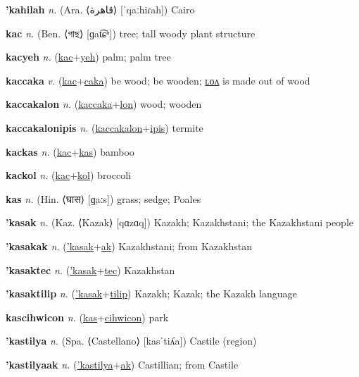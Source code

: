 \textbf{\hypertarget{'kahilah}{'kahilah}} \textit{n.} (Ara. ⟨{\arabics{}قاهرة}⟩ [ˈqaːhiɾah])
Cairo

\textbf{\hypertarget{kac}{kac}} \textit{n.} (Ben. ⟨{\bengali{}গাছ}⟩ [ɡat͡ɕʰ])
tree; tall woody plant structure

\textbf{\hypertarget{kacyeh}{kacyeh}} \textit{n.} (\hyperlink{kac}{kac}+\allowbreak \hyperlink{yeh}{yeh})
palm; palm tree

\textbf{\hypertarget{kaccaka}{kaccaka}} \textit{v.} (\hyperlink{kac}{kac}+\allowbreak \hyperlink{caka}{caka})
be wood; be wooden; \hyperlink{kaccakalon}{ʟᴏᴧ} is made out of wood

\textbf{\hypertarget{kaccakalon}{kaccakalon}} \textit{n.} (\hyperlink{kaccaka}{kaccaka}+\allowbreak \hyperlink{lon}{lon})
wood; wooden

\textbf{\hypertarget{kaccakalonipis}{kaccakalonipis}} \textit{n.} (\hyperlink{kaccakalon}{kaccakalon}+\allowbreak \hyperlink{ipis}{ipis})
termite

\textbf{\hypertarget{kackas}{kackas}} \textit{n.} (\hyperlink{kac}{kac}+\allowbreak \hyperlink{kas}{kas})
bamboo

\textbf{\hypertarget{kackol}{kackol}} \textit{n.} (\hyperlink{kac}{kac}+\allowbreak \hyperlink{kol}{kol})
broccoli

\textbf{\hypertarget{kas}{kas}} \textit{n.} (Hin. ⟨{\devanagari{}घास}⟩ [ɡ̤aːs])
grass; sedge; Poales

\textbf{\hypertarget{'kasak}{'kasak}} \textit{n.} (Kaz. ⟨Kazak⟩ [qɑzɑq])
Kazakh; Kazakhstani; the Kazakhstani people

\textbf{\hypertarget{'kasakak}{'kasakak}} \textit{n.} (\hyperlink{'kasak}{'kasak}+\allowbreak \hyperlink{ak}{ak})
Kazakhstani; from Kazakhstan

\textbf{\hypertarget{'kasaktec}{'kasaktec}} \textit{n.} (\hyperlink{'kasak}{'kasak}+\allowbreak \hyperlink{tec}{tec})
Kazakhstan

\textbf{\hypertarget{'kasaktilip}{'kasaktilip}} \textit{n.} (\hyperlink{'kasak}{'kasak}+\allowbreak \hyperlink{tilip}{tilip})
Kazakh; Kazak; the Kazakh language

\textbf{\hypertarget{kascihwicon}{kascihwicon}} \textit{n.} (\hyperlink{kas}{kas}+\allowbreak \hyperlink{cihwicon}{cihwicon})
park

\textbf{\hypertarget{'kastilya}{'kastilya}} \textit{n.} (Spa. ⟨Castellano⟩ [kasˈtiʎa])
Castile (region)

\textbf{\hypertarget{'kastilyaak}{'kastilyaak}} \textit{n.} (\hyperlink{'kastilya}{'kastilya}+\allowbreak \hyperlink{ak}{ak})
Castillian; from Castile

